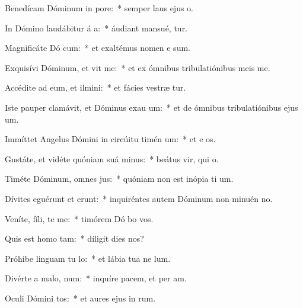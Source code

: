 \item Benedícam Dóminum in  pore:~* semper laus ejus   o.
\item In Dómino laudábitur á a:~* áudiant mansué,  tur.
\item Magnificáte Dó cum:~* et exaltémus nomen e  sum.
\item Exquisívi Dóminum, et vit me:~* et ex ómnibus tribulatiónibus meis  me.
\item Accédite ad eum, et ilmini:~* et fácies vestræ  tur.
\item Iste pauper clamávit, et Dóminus exau um:~* et de ómnibus tribulatiónibus ejus  um.
\item Immíttet Angelus Dómini in circúitu timén um:~* et e os.
\item Gustáte, et vidéte quóniam suá  minus:~* beátus vir, qui   o.
\item Timéte Dóminum, omnes  jus:~* quóniam non est inópia ti um.
\item Dívites eguérunt et erunt:~* inquiréntes autem Dóminum non minuén  no.
\item Veníte, fíli, te me:~* timórem Dó bo vos.
\item Quis est homo   tam:~* díligit dies  nos?
\item Próhibe linguam tu  lo:~* et lábia tua ne  lum.
\item Divérte a malo,   num:~* inquíre pacem, et per am.
\item Oculi Dómini  tos:~* et aures ejus in  rum.
